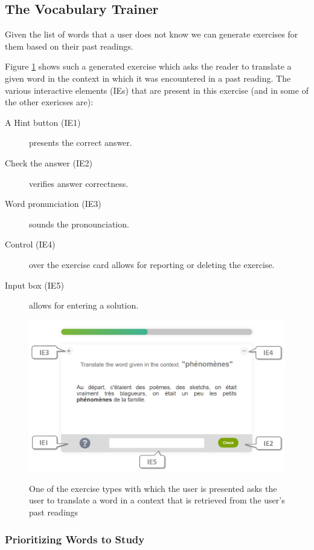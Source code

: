 \subsection{The Vocabulary Trainer}

Given the list of words that a user does not know we can generate exercises for them based on their past readings.

Figure \ref{exercise_translate} shows such a generated exercise which asks the reader to translate a given word in the context in which it was encountered in a past reading. The various interactive elements (IEs) that are present in this exercise (and in some of the other exericses are): 

\begin{description}
	\item [A Hint button (IE1)] presents the correct answer.
	\item [Check the answer (IE2)] verifies answer correctness.
	\item [Word pronunciation (IE3)] sounds the pronounciation.
	\item [Control (IE4)] over the exercise card allows for reporting or deleting the exercise.
	\item [Input box (IE5)] allows for entering a solution.
\end{description}

\begin{figure}[h!]
\centering
  \includegraphics[width=\columnwidth]{figures/exercise_translate}
  \caption{One of the exercise types with which the user is presented asks the user to translate a word in a context that is retrieved from the user's past readings}{
  \label{exercise_translate}
  }
\end{figure}

\subsubsection{Prioritizing Words to Study}

